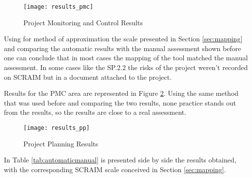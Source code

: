 \begin{figure}[H]
	\begin{center}
		\leavevmode
		\texttt{[image: results\_pmc]}
		\caption{Project Monitoring and Control Results}
		\label{fig:results_pp}
	\end{center}
\end{figure}

Using for method of approximation the scale presented in Section \ref{sec:mapping} and comparing the automatic results with the manual assessment shown before one can conclude that in most cases the mapping of the tool matched the manual assessment. In some cases like  the SP.2.2 the risks of the project weren't recorded on SCRAIM but in a document attached to the project.


Results for the PMC area are represented in Figure \ref{fig:results_pmc}. Using the same method that was used before and comparing the two results, none practice stands out from the results, so the results are close to a real assessment.

\begin{figure}[H]
	\begin{center}
		\leavevmode
		\texttt{[image: results\_pp]}
		\caption{Project Planning Results}
		\label{fig:results_pmc}
	\end{center}
\end{figure}


In Table \ref{tab:automaticmanual} is presented side by side the results obtained, with the corresponding SCRAIM scale conceived in  Section \ref{sec:mapping}.

